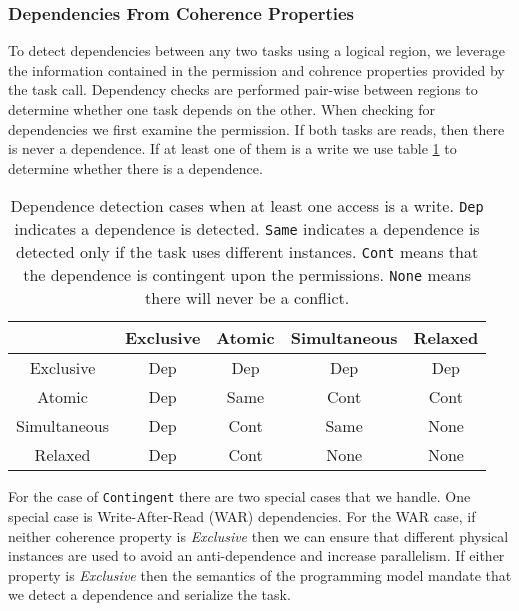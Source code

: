 \subsubsection{Dependencies From Coherence Properties}
\label{subsec:cohdep}
To detect dependencies between any two tasks using a logical region, we leverage
the information contained in the permission and cohrence properties provided by the
task call.  Dependency checks are performed pair-wise between regions
to determine whether one task depends on the other.  When checking for
dependencies we first examine the permission.  If both tasks are reads, then 
there is never a dependence.  If at least one of them is a write we use table
\ref{tab:depsdetect} to determine whether there is a dependence.
\begin{center}
\begin{table}
\begin{tabular}{|c|c|c|c|c|} \hline
             & Exclusive & Atomic   & Simultaneous & Relaxed \\ \hline 
Exclusive    & Dep & Dep & Dep & Dep \\ \hline
Atomic       & Dep & Same & Cont & Cont \\ \hline
Simultaneous & Dep & Cont & Same & None \\ \hline
Relaxed      & Dep & Cont & None & None \\ \hline
\end{tabular}
\caption{Dependence detection cases when at least one access is a write. {\tt Dep}
indicates a dependence is detected.  {\tt Same} indicates a dependence is detected
only if the task uses different instances.  {\tt Cont} means that the dependence
is contingent upon the permissions.  {\tt None} means there will never
be a conflict.\label{tab:depsdetect}}
\end{table}
\end{center}
For the case of {\tt Contingent} there are two special cases that we handle.
One special case is Write-After-Read (WAR) dependencies.  For the WAR case, if neither coherence property
is {\em Exclusive} then we can ensure that different physical instances
are used to avoid an anti-dependence and increase parallelism.  If either property is {\em Exclusive} then the semantics
of the programming model mandate that we detect a dependence and serialize the task.

